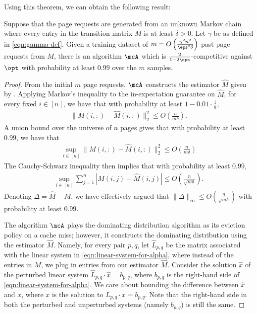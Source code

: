\documentclass[11pt]{article}
\begin{document}
Using this theorem, we can obtain the following result:

\begin{theorem}
    \label{thm:approx-lpr-from-samples}
    Suppose that the page requests are generated from an unknown Markov chain where every entry in the transition matrix $M$ is at least $\delta > 0$. Let $\gamma$ be as defined in \eqref{eqn:gamma-def}. Given a training dataset of $m = O\left(\frac{\gamma^2n^2}{\eps^2\delta}\right)$ past page requests from $M$, there is an algorithm $\mcA$ which is $\frac{2}{1-2\eps}$-competitive against $\opt$ with probability at least $0.99$ over the $m$ samples.
\end{theorem}
\begin{proof}
    From the initial $m$ page requests, $\mcA$ constructs the estimator $\hat{M}$ given by . Applying Markov's inequality to the in-expectation guarantee on $\hat{M}$, for every fixed $i \in [n]$, we have that with probability at least $1-0.01 \cdot \frac{1}{n}$, 
    \begin{align*}
        \|M(i,:) - \hat{M}(i,:)\|_2^2 \le O \left(\frac{n}{m\delta}\right).
    \end{align*}
    A union bound over the universe of $n$ pages gives that with probability at least $0.99$, we have that 
    \begin{align*}
        \sup_{i \in [n]}\|M(i,:) - \hat{M}(i,:)\|_2^2 \le O \left(\frac{n}{m\delta}\right)
    \end{align*}
    The Cauchy-Schwarz inequality then implies that with probability at least $0.99$,
    \begin{align*}
        \sup_{i \in [n]}\sum_{j=1}^n |M(i,j)-\hat{M}(i,j)| \le O \left(\frac{n}{\sqrt{m\delta}}\right).
    \end{align*}
    Denoting $\Delta = \hat{M}-M$, we have effectively argued that $\|\Delta\|_\infty \le O \left(\frac{n}{\sqrt{m\delta}}\right)$ with probability at least $0.99$.

    The algorithm $\mcA$ plays the dominating distribution algorithm as its eviction policy on a cache miss; however, it constructs the dominating distribution using the estimator $\hat{M}$. Namely, for every pair $p,q$, let $\hat{L}_{p,q}$ be the matrix associated with the linear system in \eqref{eqn:linear-system-for-alpha}, where instead of the entries in $M$, we plug in entries from our estimator $\hat{M}$. Consider the solution $\hat{x}$ of the perturbed linear system $\hat{L}_{p,q} \cdot \hat{x} = b_{p,q}$, where $b_{p,q}$ is the right-hand side of \eqref{eqn:linear-system-for-alpha}. We care about bounding the difference between $\hat{x}$ and $x$, where $x$ is the solution to $L_{p,q} \cdot x = b_{p,q}$. Note that the right-hand side in both the perturbed and unperturbed systems (namely $b_{p,q}$) is still the same.
    

\end{proof}
\end{document}
